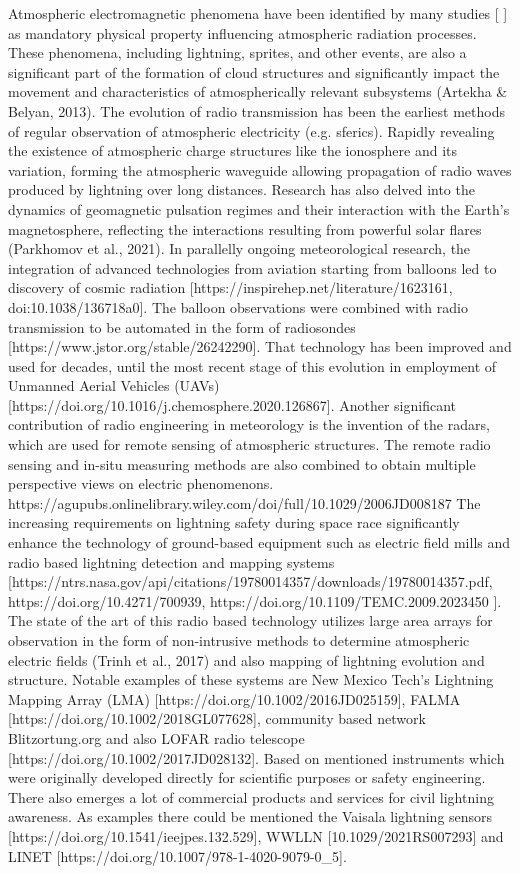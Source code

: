 Atmospheric electromagnetic phenomena have been identified by many studies [ ] as mandatory physical property influencing atmospheric radiation processes. These phenomena, including lightning, sprites, and other events, are also a significant part of  the formation of cloud structures and significantly impact the movement and characteristics of atmospherically relevant subsystems (Artekha \& Belyan, 2013).
The evolution of radio transmission has been the earliest methods of regular observation of atmospheric electricity (e.g. sferics). Rapidly revealing the existence of atmospheric charge structures like the ionosphere and its variation, forming the atmospheric waveguide allowing propagation of radio waves produced by lightning over long distances.  Research has also delved into the dynamics of geomagnetic pulsation regimes and their interaction with the Earth's magnetosphere, reflecting the interactions resulting from powerful solar flares (Parkhomov et al., 2021).
In parallelly ongoing meteorological research, the integration of advanced technologies from aviation starting from balloons led to discovery of cosmic radiation [https://inspirehep.net/literature/1623161, doi:10.1038/136718a0]. The balloon observations were combined with radio transmission to be automated in the form of radiosondes [https://www.jstor.org/stable/26242290]. That technology has been improved and used for decades, until the most recent stage of this evolution in employment of Unmanned Aerial Vehicles (UAVs) [https://doi.org/10.1016/j.chemosphere.2020.126867].
Another significant contribution of  radio engineering in meteorology is the invention of the radars, which are used for remote sensing of atmospheric structures.  The remote radio sensing and in-situ measuring methods are also combined to obtain multiple perspective views on electric phenomenons.  https://agupubs.onlinelibrary.wiley.com/doi/full/10.1029/2006JD008187
The increasing requirements on lightning safety during space race significantly enhance the technology of ground-based equipment such as electric field mills and radio based lightning detection and mapping systems [https://ntrs.nasa.gov/api/citations/19780014357/downloads/19780014357.pdf, https://doi.org/10.4271/700939, https://doi.org/10.1109/TEMC.2009.2023450 ]. The state of the art of this radio based technology utilizes large area arrays for observation in the form of non-intrusive methods to determine atmospheric electric fields (Trinh et al., 2017) and also mapping of lightning evolution and structure. Notable examples of these systems are New Mexico Tech's Lightning Mapping Array (LMA) [https://doi.org/10.1002/2016JD025159],  FALMA [https://doi.org/10.1002/2018GL077628], community based network Blitzortung.org and also LOFAR radio telescope  [https://doi.org/10.1002/2017JD028132].
Based on mentioned instruments which were originally developed directly for scientific purposes or safety engineering. There also emerges a lot of commercial products and services for civil lightning awareness. As examples there could be mentioned the Vaisala lightning sensors [https://doi.org/10.1541/ieejpes.132.529],  WWLLN [10.1029/2021RS007293] and LINET [https://doi.org/10.1007/978-1-4020-9079-0_5].


